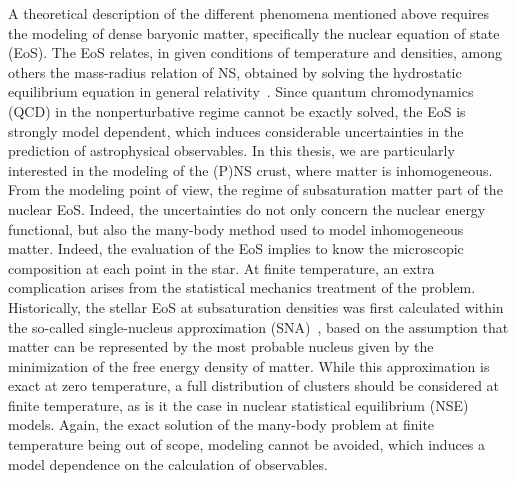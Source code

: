 A theoretical description of the different phenomena mentioned above requires 
the modeling of dense baryonic matter, specifically the nuclear equation of 
state (EoS). 
%
The EoS relates, in given conditions of temperature and 
densities,  among others the mass-radius relation of NS, obtained by solving 
  the hydrostatic equilibrium equation in general 
  relativity~\cite{Tolman1939,Oppenheimer1939}.
%
Since quantum chromodynamics (QCD) in the nonperturbative regime cannot be 
exactly solved, the EoS is strongly model dependent, which induces considerable 
uncertainties in the prediction of astrophysical observables. 
In this thesis, we are particularly interested in the modeling of the (P)NS 
crust, where matter is inhomogeneous. From the modeling point of view, the 
regime of subsaturation matter  part of the 
nuclear EoS. Indeed, the uncertainties do not only concern the nuclear energy 
functional, but also the many-body method used to model inhomogeneous matter. 
%
Indeed, the evaluation of the EoS implies to know the microscopic composition 
at each point in the star. At finite temperature, an extra complication arises
from the statistical mechanics treatment of the problem. 
Historically, the stellar EoS at subsaturation 
densities was first calculated within the so-called single-nucleus 
approximation (SNA)~\cite{BBP,Negele1973}, based on the assumption that matter 
can be represented by the most probable nucleus given by the minimization of 
the free energy density of matter. While this approximation is exact at zero
temperature, a full distribution of clusters should be considered at finite
temperature, as is it the case in nuclear statistical equilibrium (NSE) models. 
Again, the exact solution of the many-body problem at finite temperature being 
out of scope, modeling cannot be avoided, which induces a model dependence on 
the calculation of observables. 

